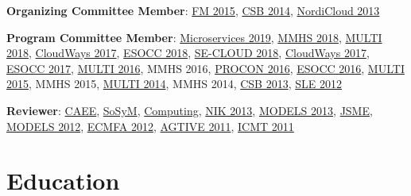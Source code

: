 \documentclass[a4paper,online]{adcv}
\begin{document}
  \textbf{Organizing Committee Member}: \href{https://doi.org/10.1007/978-3-319-19249-9}{FM 2015}, \href{https://doi.org/10.1007/978-3-319-14886-1}{CSB 2014}, \href{https://doi.org/10.1145/2513534.2513535}{NordiCloud 2013}

  \textbf{Program Committee Member}: \href{https://www.conf-micro.services/2019/}{Microservices 2019}, \href{http://ceur-ws.org/Vol-2336/}{MMHS 2018}, \href{https://www.wi-inf.uni-duisburg-essen.de/MULTI2018/}{MULTI 2018}, \href{https://sites.google.com/site/cloudwaysws18/}{CloudWays 2017}, \href{https://doi.org/10.1007/978-3-319-99819-0}{ESOCC 2018}, \href{http://www.se-cloud.scitevents.org/}{SE-CLOUD 2018}, \href{https://sites.google.com/site/cloudways17/}{CloudWays 2017}, \href{https://doi.org/10.1007/978-3-319-67262-5}{ESOCC 2017}, \href{https://swt4.informatik.uni-mannheim.de/multi-2016/}{MULTI 2016}, MMHS 2016, \href{http://procon-workshop.com/}{PROCON 2016}, \href{https://doi.org/10.1007/978-3-319-44482-6}{ESOCC 2016}, \href{https://miso.es/multi/2015/}{MULTI 2015}, MMHS 2015, \href{https://miso.es/multi/2014/}{MULTI 2014}, MMHS 2014, \href{https://sites.google.com/site/cloudbrokerworkshop/}{CSB 2013}, \href{https://doi.org/10.1007/978-3-642-36089-3}{SLE 2012}

  \textbf{Reviewer}: \href{https://ees.elsevier.com/compeleceng/}{CAEE}, \href{https://www.springer.com/journal/10270}{SoSyM}, \href{https://www.springer.com/computer/journal/607}{Computing}, \href{https://nik.no/nik-2013/}{NIK 2013}, \href{https://doi.org/10.1007/978-3-642-41533-3}{MODELS 2013}, \href{https://onlinelibrary.wiley.com/journal/20477481}{JSME}, \href{https://doi.org/10.1007/978-3-642-33666-9}{MODELS 2012}, \href{https://doi.org/10.1007/978-3-642-31491-9}{ECMFA 2012}, \href{https://doi.org/10.1007/978-3-642-34176-2}{AGTIVE 2011}, \href{https://doi.org/10.1007/978-3-642-21732-6}{ICMT 2011}
\fi

\section{Education}
\end{document}
